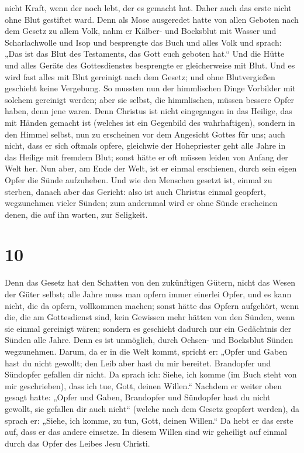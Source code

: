 nicht Kraft, wenn der noch lebt, der es gemacht hat. 
Daher auch das erste nicht ohne Blut gestiftet ward. 
Denn als Mose ausgeredet hatte von allen Geboten nach dem Gesetz zu
allem Volk, nahm er Kälber- und Bocksblut mit Wasser und Scharlachwolle
und Isop und besprengte das Buch und alles Volk  und
sprach: „Das ist das Blut des Testaments, das Gott euch geboten hat.``
 Und die Hütte und alles Geräte des Gottesdienstes
besprengte er gleicherweise mit Blut.  Und es wird fast
alles mit Blut gereinigt nach dem Gesetz; und ohne Blutvergießen
geschieht keine Vergebung.  So mussten nun der
himmlischen Dinge Vorbilder mit solchem gereinigt werden; aber sie
selbst, die himmlischen, müssen bessere Opfer haben, denn jene waren.
 Denn Christus ist nicht eingegangen in das Heilige, das
mit Händen gemacht ist (welches ist ein Gegenbild des wahrhaftigen),
sondern in den Himmel selbst, nun zu erscheinen vor dem Angesicht Gottes
für uns;  auch nicht, dass er sich oftmals opfere,
gleichwie der Hohepriester geht alle Jahre in das Heilige mit fremdem
Blut;  sonst hätte er oft müssen leiden von Anfang der
Welt her. Nun aber, am Ende der Welt, ist er einmal erschienen, durch
sein eigen Opfer die Sünde aufzuheben.  Und wie den
Menschen gesetzt ist, einmal zu sterben, danach aber das Gericht:
 also ist auch Christus einmal geopfert, wegzunehmen
vieler Sünden; zum andernmal wird er ohne Sünde erscheinen denen, die
auf ihn warten, zur Seligkeit.

\hypertarget{section-9}{%
\section{10}\label{section-9}}

 Denn das Gesetz hat den Schatten von den zukünftigen
Gütern, nicht das Wesen der Güter selbst; alle Jahre muss man opfern
immer einerlei Opfer, und es kann nicht, die da opfern, vollkommen
machen;  sonst hätte das Opfern aufgehört, wenn die, die
am Gottesdienst sind, kein Gewissen mehr hätten von den Sünden, wenn sie
einmal gereinigt wären;  sondern es geschieht dadurch nur
ein Gedächtnis der Sünden alle Jahre.  Denn es ist
unmöglich, durch Ochsen- und Bocksblut Sünden wegzunehmen.
 Darum, da er in die Welt kommt, spricht er: „Opfer und
Gaben hast du nicht gewollt; den Leib aber hast du mir bereitet.
 Brandopfer und Sündopfer gefallen dir nicht.
 Da sprach ich: Siehe, ich komme (im Buch steht von mir
geschrieben), dass ich tue, Gott, deinen Willen.`` 
Nachdem er weiter oben gesagt hatte: „Opfer und Gaben, Brandopfer und
Sündopfer hast du nicht gewollt, sie gefallen dir auch nicht`` (welche
nach dem Gesetz geopfert werden),  da sprach er: „Siehe,
ich komme, zu tun, Gott, deinen Willen.`` Da hebt er das erste auf, dass
er das andere einsetze.  In diesem Willen sind wir
geheiligt auf einmal durch das Opfer des Leibes Jesu Christi.

